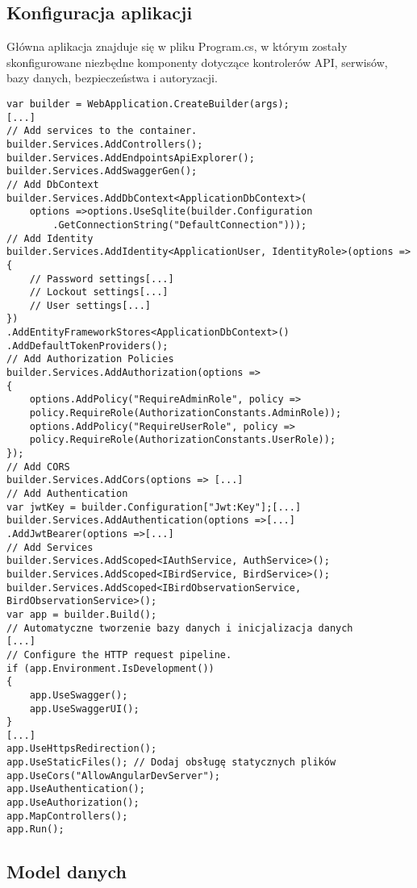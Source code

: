 \subsection{Konfiguracja aplikacji}

Główna aplikacja znajduje się w pliku Program.cs, w którym zostały skonfigurowane niezbędne komponenty dotyczące kontrolerów API, serwisów, bazy danych, bezpieczeństwa i autoryzacji.

\begin{lstlisting}[style=csharp, caption={Fragment pliku Program.cs}]
var builder = WebApplication.CreateBuilder(args);
[...]
// Add services to the container.
builder.Services.AddControllers();
builder.Services.AddEndpointsApiExplorer();
builder.Services.AddSwaggerGen();
// Add DbContext
builder.Services.AddDbContext<ApplicationDbContext>(
	options =>options.UseSqlite(builder.Configuration
		.GetConnectionString("DefaultConnection")));
// Add Identity
builder.Services.AddIdentity<ApplicationUser, IdentityRole>(options =>
{
	// Password settings[...]
	// Lockout settings[...]
	// User settings[...]
})
.AddEntityFrameworkStores<ApplicationDbContext>()
.AddDefaultTokenProviders();
// Add Authorization Policies
builder.Services.AddAuthorization(options =>
{
	options.AddPolicy("RequireAdminRole", policy =>
	policy.RequireRole(AuthorizationConstants.AdminRole));
	options.AddPolicy("RequireUserRole", policy =>
	policy.RequireRole(AuthorizationConstants.UserRole));
});
// Add CORS
builder.Services.AddCors(options => [...]
// Add Authentication
var jwtKey = builder.Configuration["Jwt:Key"];[...]
builder.Services.AddAuthentication(options =>[...]
.AddJwtBearer(options =>[...]
// Add Services
builder.Services.AddScoped<IAuthService, AuthService>();
builder.Services.AddScoped<IBirdService, BirdService>();
builder.Services.AddScoped<IBirdObservationService, BirdObservationService>();
var app = builder.Build();
// Automatyczne tworzenie bazy danych i inicjalizacja danych
[...]
// Configure the HTTP request pipeline.
if (app.Environment.IsDevelopment())
{
	app.UseSwagger();
	app.UseSwaggerUI();
}
[...]
app.UseHttpsRedirection();
app.UseStaticFiles(); // Dodaj obsługę statycznych plików
app.UseCors("AllowAngularDevServer");
app.UseAuthentication();
app.UseAuthorization();
app.MapControllers();
app.Run();
\end{lstlisting}

\subsection{Model danych}

